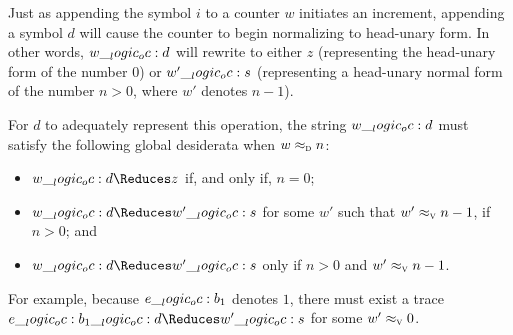 Just as appending the symbol $i$ to a counter $w$ initiates an increment, appending a symbol $d$ will cause the counter to begin normalizing to head-unary form.
In other words, $w \__logic_oc: d$ will rewrite to either $z$ (representing the head-unary form of the number $0$) or $w' \__logic_oc: s$ (representing a head-unary normal form of the number $n>0$, where $w'$ denotes $n-1$).

For $d$ to adequately represent this operation, the string $w \__logic_oc: d$ must satisfy the following global desiderata when $w \approx\sb{\text{\normalfont\scshape d}} n$:
%
  \begin{itemize}%
  \item $w \oc d \Reduces z$ if, and only if, $n=0$;
  \item $w \oc d \Reduces w' \oc s$ for some $w'$ such that $w' \approx\sb{\text{\normalfont\scshape v}} n-1$, if $n > 0$; and
  \item $w \oc d \Reduces w' \oc s$ only if $n > 0$ and $w' \approx\sb{\text{\normalfont\scshape v}} n-1$.
  \end{itemize}
%
{}
For example, because $e \__logic_oc: b_1$ denotes $1$, there must exist a trace $e \oc b_1 \oc d \Reduces w' \oc s$ for some $w' \approx\sb{\text{\normalfont\scshape v}} 0$.

